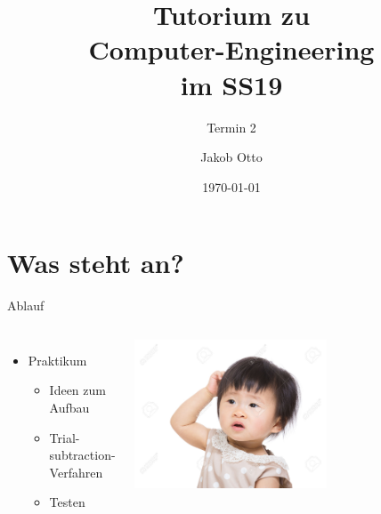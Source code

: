 \documentclass[aspectratio=169,presentation]{beamer}
\date{\today}
\newcommand{\terminNummer}{2}
\begin{document}
\title[CE Tutorium]{Tutorium zu\\Computer-Engineering\\im SS19}
\subtitle{Termin \terminNummer}
\author[Otto]{Jakob Otto}
\subject{CE Tutorium}

\begin{frame}
	\titlepage
\end{frame}

\section{Was steht an?}
\begin{frame}{Ablauf}
	\begin{columns}
		\begin{itemize}
			\item Praktikum
			\begin{itemize}
				\item Ideen zum Aufbau
				\item Trial-subtraction-Verfahren
				\item Testen
			\end{itemize}
		\end{itemize}
		\includegraphics[width=0.6\textwidth]{kratzen}
	\end{columns}
\end{frame}

\end{document}
